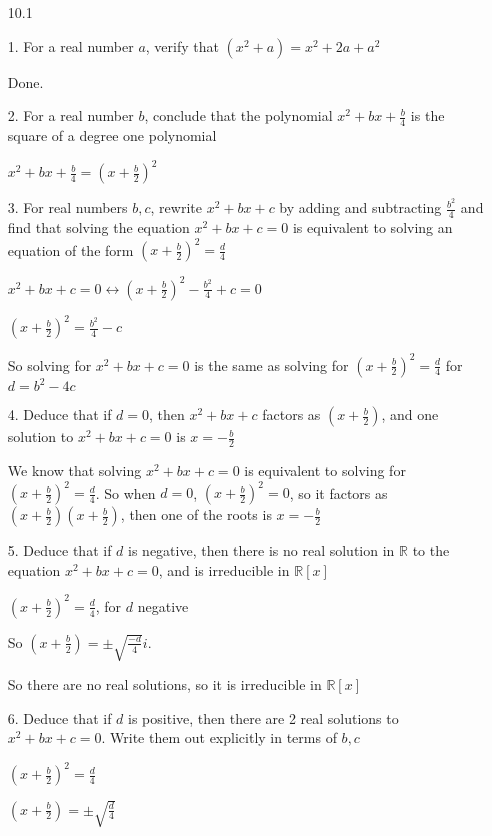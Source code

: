 \documentclass[12pt]{article}
\begin{document}
\begin{itemize}

\newpage

\item[10.1]

	1. For a real number $a$, verify that $(x^2 + a) = x^2 + 2a + a^2$

	Done.

	2. For a real number $b$, conclude that the polynomial $x^2 + bx + \frac{b}{4}$ is the square of a degree one polynomial

		$x^2 + bx + \frac{b}{4} = (x + \frac{b}{2})^2$

	3. For real numbers $b, c$, rewrite $x^2 + bx + c$ by adding and subtracting $\frac{b^2}{4}$ and find that solving the equation $x^2 + bx + c = 0$ is equivalent to solving an equation of the form $(x + \frac{b}{2})^2 = \frac{d}{4}$

		$x^2 + bx + c = 0 \leftrightarrow (x + \frac{b}{2})^2 - \frac{b^2}{4} + c = 0$

		$(x + \frac{b}{2})^2 = \frac{b^2}{4} - c$

		So solving for $x^2 + bx + c = 0$ is the same as solving for $(x + \frac{b}{2})^2 = \frac{d}{4}$ for $d = b^2 - 4c$

		4. Deduce that if $d = 0$, then $x^2 + bx + c$ factors as $(x + \frac{b}{2})$, and one solution to $x^2 + bx + c = 0$ is $x = - \frac{b}{2}$

		We know that solving $x^2 + bx + c = 0$ is equivalent to solving for $(x + \frac{b}{2})^2 = \frac{d}{4}$. So when $d = 0$, $(x+\frac{b}{2})^2 = 0$, so it factors as $(x + \frac{b}{2})(x + \frac{b}{2})$, then one of the roots is $x = - \frac{b}{2}$

		5. Deduce that if $d$ is negative, then there is no real solution in $\mathbb{R}$ to the equation $x^2 + bx + c = 0$, and is irreducible in $\mathbb{R}[x]$

	$(x + \frac{b}{2})^2 = \frac{d}{4}$, for $d$ negative

	So $(x + \frac{b}{2}) = \pm \sqrt{\frac{-d}{4}}i$. 

		So there are no real solutions, so it is irreducible in $\mathbb{R}[x]$

	6. Deduce that if $d$ is positive, then there are 2 real solutions to $x^2 + bx + c = 0$. Write them out explicitly in terms of $b, c$

	$(x + \frac{b}{2})^2 = \frac{d}{4}$

		$(x + \frac{b}{2}) = \pm \sqrt{\frac{d}{4}}$


\end{itemize}
\end{document}
